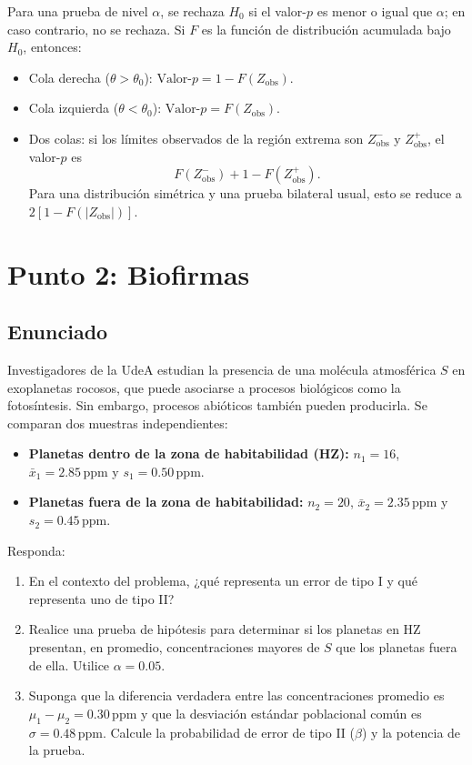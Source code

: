 \documentclass[12pt]{article}
\begin{document}
\begin{enumerate}[label=(\alph*)]
    Para una prueba de nivel $\alpha$, se rechaza $H_0$ si el valor-$p$ es menor o igual que $\alpha$; en caso contrario, no se rechaza. Si $F$ es la función de distribución acumulada bajo $H_0$, entonces:
    \begin{itemize}
        \item Cola derecha ($\theta>\theta_0$): $\text{Valor-}p=1-F(Z_{\mathrm{obs}})$.
        \item Cola izquierda ($\theta<\theta_0$): $\text{Valor-}p=F(Z_{\mathrm{obs}})$.
        \item Dos colas: si los límites observados de la región extrema son $Z_{\mathrm{obs}}^{-}$ y $Z_{\mathrm{obs}}^{+}$, el valor-$p$ es
        $$
        F(Z_{\mathrm{obs}}^{-})+1-F(Z_{\mathrm{obs}}^{+}).
        $$
        Para una distribución simétrica y una prueba bilateral usual, esto se reduce a $2[1-F(|Z_{\mathrm{obs}}|)]$.
    \end{itemize}
\end{enumerate}

\section*{Punto 2: Biofirmas}

\subsection*{Enunciado}
Investigadores de la UdeA estudian la presencia de una molécula atmosférica $S$ en exoplanetas rocosos, que puede asociarse a procesos biológicos como la fotosíntesis. Sin embargo, procesos abióticos también pueden producirla. Se comparan dos muestras independientes:
\begin{itemize}
    \item \textbf{Planetas dentro de la zona de habitabilidad (HZ):} $n_1=16$, $\bar{x}_1=2.85\,\mathrm{ppm}$ y $s_1=0.50\,\mathrm{ppm}$.
    \item \textbf{Planetas fuera de la zona de habitabilidad:} $n_2=20$, $\bar{x}_2=2.35\,\mathrm{ppm}$ y $s_2=0.45\,\mathrm{ppm}$.
\end{itemize}
Responda:
\begin{enumerate}[label=(\alph*)]
    \item En el contexto del problema, ¿qué representa un error de tipo I y qué representa uno de tipo II?
    \item Realice una prueba de hipótesis para determinar si los planetas en HZ presentan, en promedio, concentraciones mayores de $S$ que los planetas fuera de ella. Utilice $\alpha=0.05$.
    \item Suponga que la diferencia verdadera entre las concentraciones promedio es $\mu_1-\mu_2=0.30\,\mathrm{ppm}$ y que la desviación estándar poblacional común es $\sigma=0.48\,\mathrm{ppm}$. Calcule la probabilidad de error de tipo II ($\beta$) y la potencia de la prueba.
\end{enumerate}
\end{document}
